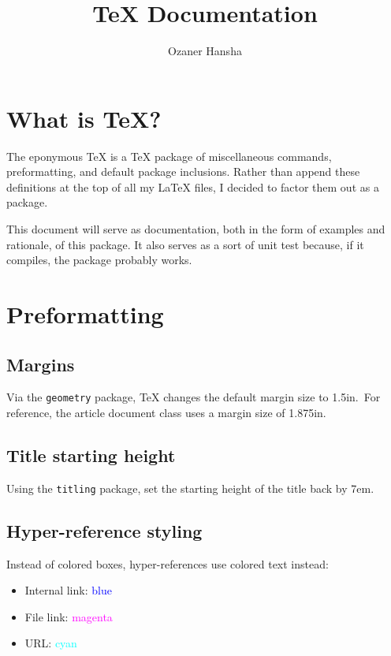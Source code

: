 \documentclass{article}
\begin{document}
\title{\Ozaner\TeX{} Documentation}
\author{Ozaner Hansha}
\date{}
\maketitle
\setcounter{section}{-1}

\section*{What is \Ozanerbf\TeX{}?}
The eponymous \Ozaner\TeX{} is a \TeX{} package of miscellaneous commands, preformatting, and default package inclusions. Rather than append these definitions at the top of all my \LaTeX{} files, I decided to factor them out as a package.

This document will serve as documentation, both in the form of examples and rationale, of this package. It also serves as a sort of unit test because, if it compiles, the package probably works.

\tableofcontents

\newpage{}

\section{Preformatting}
\subsection{Margins}
Via the \texttt{geometry} package, \Ozaner\TeX{} changes the default margin size to 1.5in.\ For reference, the article document class uses a margin size of 1.875in.

\subsection{Title starting height}
Using the \texttt{titling} package, set the starting height of the title back by 7em.

\subsection{Hyper-reference styling}
Instead of colored boxes, hyper-references use colored text instead:
\begin{itemize}
  \item Internal link: \textcolor{blue}{blue}
  \item File link: \textcolor{magenta}{magenta}
  \item URL: \textcolor{cyan}{cyan}
\end{itemize}
\end{document}
